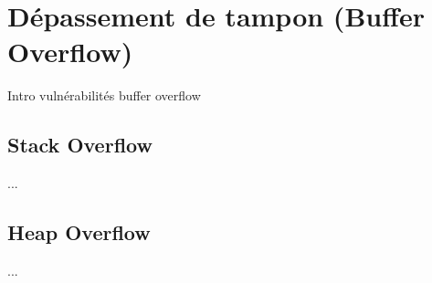

\newpage
\section{Dépassement de tampon (Buffer Overflow)}\label{vulnerabilites:applicatives:buffer-overflow}

Intro vulnérabilités buffer overflow

\subsection{Stack Overflow}\label{vulnerabilites:applicatives:buffer-overflow:stack}

...

\subsection{Heap Overflow}\label{vulnerabilites:applicatives:buffer-overflow:heap}

...

\endinput
